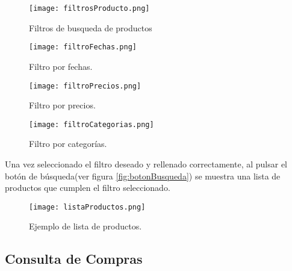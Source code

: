 \begin{figure}[ht]
\begin{center}
  \texttt{[image: filtrosProducto.png]}
  \caption{Filtros de busqueda de productos}\label{fig:filtrosProducto}
\endminipage
\end{center}
\end{figure}

\begin{figure}[ht]
\begin{center}
  \texttt{[image: filtroFechas.png]}
  \caption{Filtro por fechas.}\label{fig:filtroFechas}
\endminipage 
\end{center}
\end{figure}

\begin{figure}[ht]
\begin{center}
  \texttt{[image: filtroPrecios.png]}
  \caption{Filtro por precios.}\label{fig:filtroPrecios}
\endminipage 
\end{center}
\end{figure}

\begin{figure}[ht]
\begin{center}
  \texttt{[image: filtroCategorias.png]}
  \caption{Filtro por categorías.}\label{fig:filtroCategorias}
\endminipage 
\end{center}
\end{figure}
\cleardoublepage
Una vez seleccionado el filtro deseado y rellenado correctamente, al pulsar el botón de búsqueda(ver figura \ref{fig:botonBusqueda}) se muestra una lista de productos que cumplen el filtro seleccionado.

\begin{figure}[ht]
\begin{center}
  \texttt{[image: listaProductos.png]}
  \caption{Ejemplo de lista de productos.}\label{fig:listaProductos}
\endminipage 
\end{center}
\end{figure}

\cleardoublepage

\subsection{Consulta de Compras \label{consultaCompras}} 

